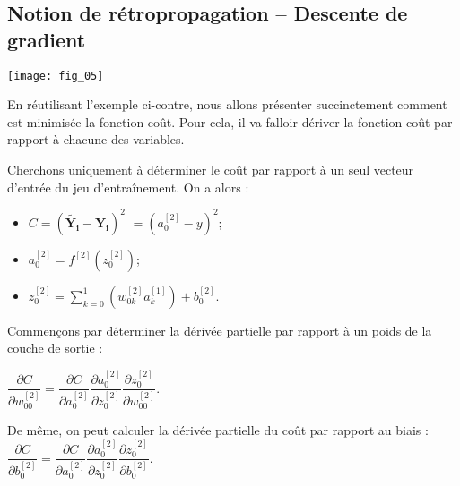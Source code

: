 \subsection{Notion de rétropropagation -- Descente de gradient}

\begin{marginfigure}
\texttt{[image: fig\_05]}
\end{marginfigure}


En réutilisant l'exemple ci-contre, nous allons présenter succinctement comment est minimisée la fonction coût.
Pour cela, il va falloir dériver la fonction coût par rapport à chacune des variables. 

Cherchons uniquement à déterminer le coût par rapport à un seul vecteur d'entrée du jeu d'entraînement. On a alors : 
\begin{itemize}
\item $C = \left( \mathbf{\tilde{Y_i}} - \mathbf{Y_i}  \right)^2$ $= \left( a^{[2]}_{0} - y  \right)^2$;
\item $ a^{[2]}_{0} = f^{[2]}\left(z_0^{[2]}\right)$;
\item $z_0^{[2]} =\sum\limits_{k=0}^{1}\left( w^{[2]}_{0k} a_k^{[1]} \right) + b^{[2]}_{0}$.
\end{itemize}

%



Commençons par déterminer la dérivée partielle par rapport à un poids de la couche de sortie : 

$\dfrac{\partial C}{\partial w^{[2]}_{00}}=\dfrac{\partial C}{\partial a^{[2]}_{0}}\dfrac{\partial  a^{[2]}_{0}}{\partial z^{[2]}_{0}}\dfrac{\partial z^{[2]}_{0}}{\partial w^{[2]}_{00}}$.

De même, on peut calculer la dérivée partielle du coût par rapport au biais : 
$\dfrac{\partial C}{\partial b^{[2]}_{0}}=\dfrac{\partial C}{\partial a^{[2]}_{0}}\dfrac{\partial  a^{[2]}_{0}}{\partial z^{[2]}_{0}}\dfrac{\partial z^{[2]}_{0}}{\partial b^{[2]}_{0}}$.

